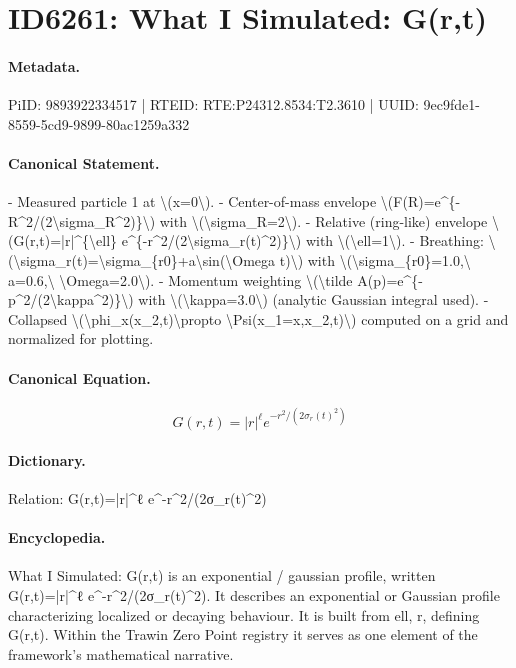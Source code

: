 \section*{ID6261: What I Simulated: G(r,t)}
\paragraph{Metadata.}
PiID: 9893922334517 | RTEID: RTE:P24312.8534:T2.3610 | UUID: 9ec9fde1-8559-5cd9-9899-80ac1259a332

\paragraph{Canonical Statement.}
- Measured particle 1 at \textbackslash{}(x=0\textbackslash{}). - Center-of-mass envelope \textbackslash{}(F(R)=e\textasciicircum{}\{-R\textasciicircum{}2/(2\textbackslash{}sigma\_R\textasciicircum{}2)\}\textbackslash{}) with \textbackslash{}(\textbackslash{}sigma\_R=2\textbackslash{}). - Relative (ring-like) envelope \textbackslash{}(G(r,t)=|r|\textasciicircum{}\{\textbackslash{}ell\} e\textasciicircum{}\{-r\textasciicircum{}2/(2\textbackslash{}sigma\_r(t)\textasciicircum{}2)\}\textbackslash{}) with \textbackslash{}(\textbackslash{}ell=1\textbackslash{}). - Breathing: \textbackslash{}(\textbackslash{}sigma\_r(t)=\textbackslash{}sigma\_\{r0\}+a\textbackslash{}sin(\textbackslash{}Omega t)\textbackslash{}) with \textbackslash{}(\textbackslash{}sigma\_\{r0\}=1.0,\textbackslash{} a=0.6,\textbackslash{} \textbackslash{}Omega=2.0\textbackslash{}). - Momentum weighting \textbackslash{}(\textbackslash{}tilde A(p)=e\textasciicircum{}\{-p\textasciicircum{}2/(2\textbackslash{}kappa\textasciicircum{}2)\}\textbackslash{}) with \textbackslash{}(\textbackslash{}kappa=3.0\textbackslash{}) (analytic Gaussian integral used). - Collapsed \textbackslash{}(\textbackslash{}phi\_x(x\_2,t)\textbackslash{}propto \textbackslash{}Psi(x\_1=x,x\_2,t)\textbackslash{}) computed on a grid and normalized for plotting.

\paragraph{Canonical Equation.}
\[
G(r,t)=|r|^{\ell} e^{-r^2/(2\sigma_r(t)^2)}
\]

\paragraph{Dictionary.}
Relation: G(r,t)=|r|\textasciicircum{}ℓ e\textasciicircum{}-r\textasciicircum{}2/(2σ\_r(t)\textasciicircum{}2)

\paragraph{Encyclopedia.}
What I Simulated: G(r,t) is an exponential / gaussian profile, written G(r,t)=|r|\textasciicircum{}ℓ e\textasciicircum{}-r\textasciicircum{}2/(2σ\_r(t)\textasciicircum{}2). It describes an exponential or Gaussian profile characterizing localized or decaying behaviour. It is built from ell, r, defining G(r,t). Within the Trawin Zero Point registry it serves as one element of the framework's mathematical narrative.
